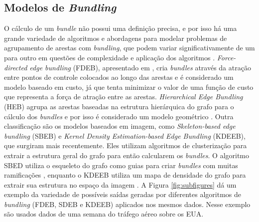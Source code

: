 \subsection{Modelos de \emph{Bundling}}

  O cálculo de um \emph{bundle} não possui uma definição precisa, e por isso há
uma grande variedade de algoritmos e abordagens para modelar problemas de
agrupamento de arestas com \emph{bundling}, que podem variar significativamente
de um para outro em questões de complexidade e aplicação dos algoritmos
\citep{Zhou2013}.  \emph{Force-directed edge bundling} (FDEB), apresentado em
\citet{Holten2009}, cria \emph{bundles} através da atração entre pontos de
controle colocados ao longo das arestas e é considerado um modelo baseado em
custo, já que tenta minimizar o valor de uma função de custo que representa a
força de atração entre as arestas.  \emph{Hierarchical Edge Bundling} (HEB)
agrupa as arestas baseadas na estrutura hierárquica do grafo para o cálculo dos
\emph{bundles} e por isso é considerado um modelo geométrico \citep{Holten2006}. Outra
classificação são os modelos baseados em imagem, como \emph{Skeleton-based edge
bundling} (SBEB) e \emph{Kernel Density Estimation-based Edge Bundling}
(KDEEB), que surgiram mais recentemente. Eles utilizam algoritmos de
clusterização para extrair a estrutura geral do grafo para então calcularem os
\emph{bundles}. O algoritmo SBED utiliza o esqueleto do grafo como guias para
criar \emph{bundles} com muitas ramificações \citep{Ersoy2011}, enquanto o
KDEEB utiliza um mapa de densidade do grafo para extrair sua estrutura no
espaço da imagem \citep{Hurter2012}. A Figura \ref{fig:subfigures} dá um
exemplo da variedade de possíveis saídas geradas por diferentes algoritmos de
\emph{bundling} (FDEB, SDEB e KDEEB) aplicados nos mesmos dados.  Nesse exemplo
são usados dados de uma semana do tráfego aéreo sobre os EUA.

